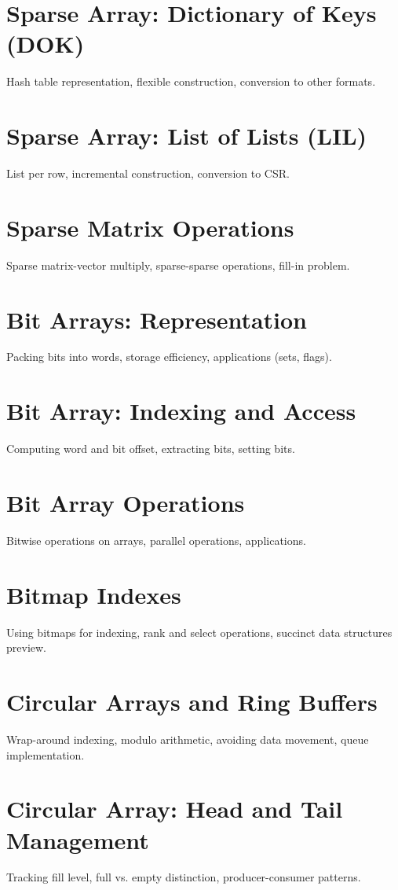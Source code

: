 \chapter{Sparse Array: Dictionary of Keys (DOK)}
Hash table representation, flexible construction, conversion to other formats.

\chapter{Sparse Array: List of Lists (LIL)}
List per row, incremental construction, conversion to CSR.

\chapter{Sparse Matrix Operations}
Sparse matrix-vector multiply, sparse-sparse operations, fill-in problem.

\chapter{Bit Arrays: Representation}
Packing bits into words, storage efficiency, applications (sets, flags).

\chapter{Bit Array: Indexing and Access}
Computing word and bit offset, extracting bits, setting bits.

\chapter{Bit Array Operations}
Bitwise operations on arrays, parallel operations, applications.

\chapter{Bitmap Indexes}
Using bitmaps for indexing, rank and select operations, succinct data structures preview.

\chapter{Circular Arrays and Ring Buffers}
Wrap-around indexing, modulo arithmetic, avoiding data movement, queue implementation.

\chapter{Circular Array: Head and Tail Management}
Tracking fill level, full vs. empty distinction, producer-consumer patterns.

